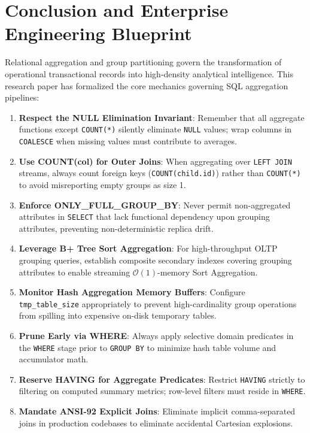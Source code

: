 \documentclass[10pt,twocolumn,letterpaper]{article}
\begin{document}
\section{Conclusion and Enterprise Engineering Blueprint}
\label{sec:conclusion}

Relational aggregation and group partitioning govern the transformation of operational transactional records into high-density analytical intelligence. This research paper has formalized the core mechanics governing SQL aggregation pipelines:

\begin{enumerate}
    \item \textbf{Respect the NULL Elimination Invariant}: Remember that all aggregate functions except \texttt{COUNT(*)} silently eliminate \texttt{NULL} values; wrap columns in \texttt{COALESCE} when missing values must contribute to averages.
    \item \textbf{Use COUNT(col) for Outer Joins}: When aggregating over \texttt{LEFT JOIN} streams, always count foreign keys (\texttt{COUNT(child.id)}) rather than \texttt{COUNT(*)} to avoid misreporting empty groups as size 1.
    \item \textbf{Enforce ONLY\_FULL\_GROUP\_BY}: Never permit non-aggregated attributes in \texttt{SELECT} that lack functional dependency upon grouping attributes, preventing non-deterministic replica drift.
    \item \textbf{Leverage B+ Tree Sort Aggregation}: For high-throughput OLTP grouping queries, establish composite secondary indexes covering grouping attributes to enable streaming $\mathcal{O}(1)$-memory Sort Aggregation.
    \item \textbf{Monitor Hash Aggregation Memory Buffers}: Configure \texttt{tmp\_table\_size} appropriately to prevent high-cardinality group operations from spilling into expensive on-disk temporary tables.
    \item \textbf{Prune Early via WHERE}: Always apply selective domain predicates in the \texttt{WHERE} stage prior to \texttt{GROUP BY} to minimize hash table volume and accumulator math.
    \item \textbf{Reserve HAVING for Aggregate Predicates}: Restrict \texttt{HAVING} strictly to filtering on computed summary metrics; row-level filters must reside in \texttt{WHERE}.
    \item \textbf{Mandate ANSI-92 Explicit Joins}: Eliminate implicit comma-separated joins in production codebases to eliminate accidental Cartesian explosions.
\end{enumerate}
\end{document}
